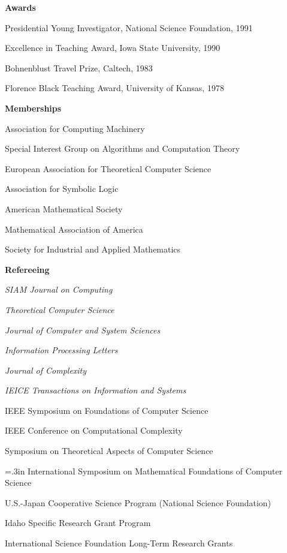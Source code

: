 \hangindent=0in
\vspace*{\bigskipamount}
{\bf Awards}

\vspace*{\smallskipamount}
Presidential Young Investigator, National Science Foundation, 1991

Excellence in Teaching Award, Iowa State University, 1990

Bohnenblust Travel Prize, Caltech, 1983

Florence Black Teaching Award, University of Kansas, 1978

\vspace*{\bigskipamount}
{\bf Memberships}

\vspace*{\smallskipamount}
Association for Computing Machinery

Special Interest Group on Algorithms and Computation Theory

European Association for Theoretical Computer Science

Association for Symbolic Logic

American Mathematical Society

Mathematical Association of America

Society for Industrial and Applied Mathematics

\vspace*{\bigskipamount}
{\bf Refereeing}

{\em SIAM Journal on Computing}

{\em Theoretical Computer Science}

{\em Journal of Computer and System Sciences}

{\em Information Processing Letters}

{\em Journal of Complexity}

{\em IEICE Transactions on Information and Systems}

IEEE Symposium on Foundations of Computer Science

IEEE Conference on Computational Complexity

Symposium on Theoretical Aspects of Computer Science

\hangindent=.3in
International Symposium on Mathematical Foundations of
Computer Science

U.S.-Japan Cooperative Science Program (National Science Foundation)

Idaho Specific Research Grant Program

International Science Foundation Long-Term Research Grants

